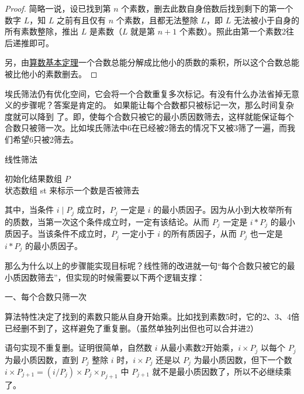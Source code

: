 \begin{proof}
    简略一说，设已找到第 $n$ 个素数，删去此数自身倍数后找到剩下的第一个数字 $L$，知 $L$ 之前有且仅有 $n$ 个素数，且都无法整除 $L$，即 $L$ 无法被小于自身的所有素数整除，推出 $L$ 是素数（$L$ 就是第 $n+1$ 个素数）。照此由第一个素数2往后递推即可。

    另，由\href{https://en.wikipedia.org/wiki/Fundamental_theorem_of_arithmetic}{算数基本定理}一个合数总能分解成比他小的质数的乘积，所以这个合数总能被比他小的素数删去。
\end{proof}

埃氏筛法仍有优化空间，它会将一个合数重复多次标记。有没有什么办法省掉无意义的步骤呢？答案是肯定的。
如果能让每个合数都只被标记一次，那么时间复杂度就可以降到  了。即，使每个合数只被它的最小质因数筛去，这样就能保证每个合数只被筛一次。比如埃氏筛法中6在已经被2筛去的情况下又被3筛了一遍，而我们希望6只被2筛去。

\begin{algorithm}[H] %
    \caption{线性筛法}
    \SetAlgoLined
    初始化结果数组 $P$ \\
    状态数组 st 来标示一个数是否被筛去 \\

\end{algorithm}

其中，当条件 $i \mid P_j$ 成立时，$P_j$ 一定是 $i$ 的最小质因子。因为从小到大枚举所有的质数，当第一次这个条件成立时，一定有该结论。从而 $P_j$ 一定是 $i * P_j$ 的最小质因子。当该条件不成立时，$P_j$ 一定小于 $i$ 的所有质因子，从而 $P_j$ 也一定是 $i * P_j$ 的最小质因子。

那么为什么以上的步骤能实现目标呢？线性筛的改进就一句“每个合数只被它的最小质因数筛去”，但实现的时候需要以下两个逻辑支撑：

一、每个合数只筛一次

\begin{myenum}
    \item 算法特性决定了找到的素数只能从自身开始乘。比如找到素数5时，它的2、3、4倍已经删不到了，这样避免了重复删。（虽然单独列出但也可以合并进2）
    \item {}语句实现不重复删。证明很简单，自然数 $i$ 从最小素数2开始乘，$i\times P_j$ 以每个 $P_j$ 为最小质因数，直到 $P_j$ 整除 $i$ 时，$i\times P_j$ 还是以 $P_j$ 为最小质因数，但下一个数 $i\times P_{j+1}=(i/P_j)\times P_j\times p_{j+1}$ 中 $P_{j+1}$ 就不是最小质因数了，所以不必继续乘了。
\end{myenum}

